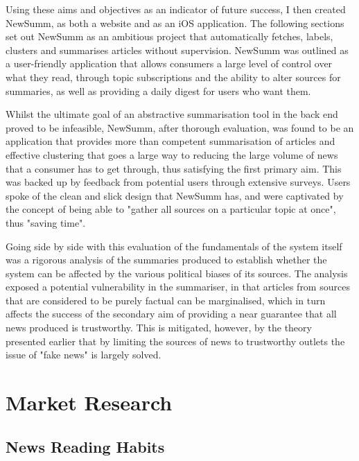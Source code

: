 \documentclass[12pt]{article}
\begin{document}
Using these aims and objectives as an indicator of future success, I then created NewSumm, as both a website and as an iOS application. The following sections set out NewSumm as an ambitious project that automatically fetches, labels, clusters and summarises articles without supervision. NewSumm was outlined as a user-friendly application that allows consumers a large level of control over what they read, through topic subscriptions and the ability to alter sources for summaries, as well as providing a daily digest for users who want them.

Whilst the ultimate goal of an abstractive summarisation tool in the back end proved to be infeasible, NewSumm, after thorough evaluation, was found to be an application that provides more than competent summarisation of articles and effective clustering that goes a large way to reducing the large volume of news that a consumer has to get through, thus satisfying the first primary aim. This was backed up by feedback from potential users through extensive surveys. Users spoke of the clean and slick design that NewSumm has, and were captivated by the concept of being able to "gather all sources on a particular topic at once", thus "saving time".

Going side by side with this evaluation of the fundamentals of the system itself was a rigorous analysis of the summaries produced to establish whether the system can be affected by the various political biases of its sources. The analysis exposed a potential vulnerability in the summariser, in that articles from sources that are considered to be purely factual can be marginalised, which in turn affects the success of the secondary aim of providing a near guarantee that all news produced is trustworthy. This is mitigated, however, by the theory presented earlier that by limiting the sources of news to trustworthy outlets the issue of "fake news" is largely solved.


\pagebreak

\section{Market Research}

\subsection{News Reading Habits}
\end{document}
